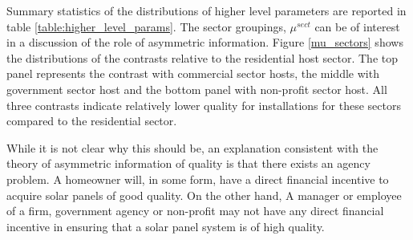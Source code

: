 \documentclass[12pt]{article}
\begin{document}
Summary statistics of the distributions of higher level parameters are reported in table \ref{table:higher_level_params}. The sector groupings, $\mu^{sect}$ can be of interest in a discussion of the role of asymmetric information. Figure \ref{mu_sectors} shows the distributions of the contrasts relative to the residential host sector. The top panel represents the contrast with commercial sector hosts, the middle with government sector host and the bottom panel with non-profit sector host. All three contrasts indicate relatively lower quality for installations for these sectors compared to the residential sector.

While it is not clear why this should be, an explanation consistent with the theory of asymmetric information of quality is that there exists an agency problem. A homeowner will, in some form, have a direct financial incentive to acquire solar panels of good quality. On the other hand, A manager or employee of a firm, government agency or non-profit may not have any direct financial incentive in ensuring that a solar panel system is of high quality.
\end{document}

